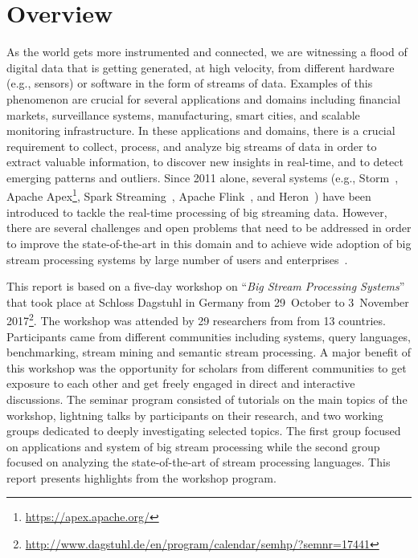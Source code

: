 \section{Overview}\label{sec:overview}

As the world gets more instrumented and connected, we are witnessing a
flood of digital data that is getting generated, at high velocity,
from different hardware (e.g., sensors) or software in the form of
streams of data. Examples of this phenomenon are crucial for several
applications and domains including financial markets, surveillance
systems, manufacturing, smart cities, and scalable monitoring
infrastructure. In these applications and domains, there is a crucial
requirement to collect, process, and analyze big streams of data in
order to extract valuable information, to discover new insights in
real-time, and to detect emerging patterns and outliers. Since 2011
alone, several systems (e.g.,
Storm~\cite{toshniwal_et_al_2014},
Apache Apex\footnote{\url{https://apex.apache.org/}},
Spark Streaming~\cite{zaharia_et_al_2013},
Apache Flink~\cite{carbone_et_al_2015}, and
Heron~\cite{kulkarni_et_al_2015}) have
been introduced to tackle the real-time processing of big streaming
data. However, there are several challenges and open problems that
need to be addressed in order to improve the state-of-the-art in this
domain and to achieve wide adoption of big stream processing systems
by large number of users and enterprises~\cite{sakr2016big}.

This report is based on a five-day workshop on ``\emph{Big Stream
  Processing Systems}'' that took place at Schloss Dagstuhl in Germany
from 29~October to 3~November 2017\footnote{\url{http://www.dagstuhl.de/en/program/calendar/semhp/?semnr=17441}}. The workshop was attended by 29
researchers from from 13 countries. Participants came from different
communities including systems, query languages, benchmarking, stream
mining and semantic stream processing. A major benefit of this
workshop was the opportunity for scholars from different communities
to get exposure to each other and get freely engaged in direct and
interactive discussions. The seminar program consisted of tutorials on
the main topics of the workshop, lightning talks by participants on
their research, and two working groups dedicated to deeply
investigating selected topics. The first group focused on applications
and system of big stream processing while the second group focused on
analyzing the state-of-the-art of stream processing languages. This
report presents highlights from the workshop program.
